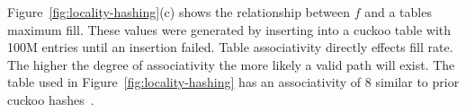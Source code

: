 Figure~\ref{fig:locality-hashing}(c) shows the relationship
between $f$ and a tables maximum fill. These values were
generated by inserting into a cuckoo table with 100M entries
until an insertion failed. Table associativity directly
effects fill rate. The higher the degree of associativity
the more likely a valid path will exist. The table used in
Figure~\ref{fig:locality-hashing} has an associativity of 8
similar to prior cuckoo
hashes~\cite{memc3,cuckoo-improvements,pilaf}.






